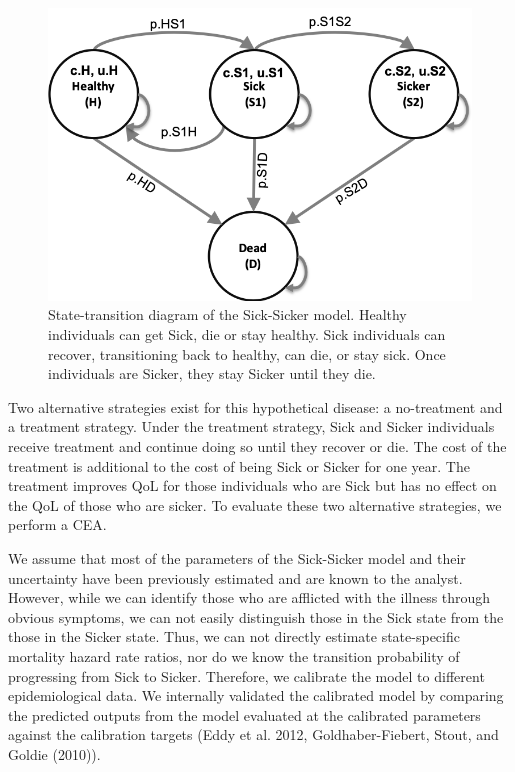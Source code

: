 \documentclass[]{article}
\begin{document}
\begin{figure}
\centering
\includegraphics{../figs/Sick-Sicker figure.png}
\caption{State-transition diagram of the Sick-Sicker model. Healthy
individuals can get Sick, die or stay healthy. Sick individuals can
recover, transitioning back to healthy, can die, or stay sick. Once
individuals are Sicker, they stay Sicker until they die.
\label{fig:STM Sick-Sicker}}
\end{figure}

Two alternative strategies exist for this hypothetical disease: a
no-treatment and a treatment strategy. Under the treatment strategy,
Sick and Sicker individuals receive treatment and continue doing so
until they recover or die. The cost of the treatment is additional to
the cost of being Sick or Sicker for one year. The treatment improves
QoL for those individuals who are Sick but has no effect on the QoL of
those who are sicker. To evaluate these two alternative strategies, we
perform a CEA.

We assume that most of the parameters of the Sick-Sicker model and their
uncertainty have been previously estimated and are known to the analyst.
However, while we can identify those who are afflicted with the illness
through obvious symptoms, we can not easily distinguish those in the
Sick state from the those in the Sicker state. Thus, we can not directly
estimate state-specific mortality hazard rate ratios, nor do we know the
transition probability of progressing from Sick to Sicker. Therefore, we
calibrate the model to different epidemiological data. We internally
validated the calibrated model by comparing the predicted outputs from
the model evaluated at the calibrated parameters against the calibration
targets (Eddy et al. 2012, Goldhaber-Fiebert, Stout, and Goldie (2010)).
\end{document}
